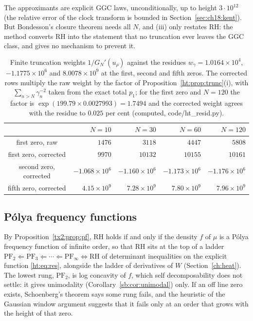 The approximants are explicit GGC laws, unconditionally, up to height $3\cdot10^{12}$ (the relative error of the clock transform is bounded in Section~\ref{sec:ch18:kent}). But Bondesson's closure theorem needs all $N$, and (iii) only restates RH: the method converts RH into the statement that no truncation ever leaves the GGC class, and gives no mechanism to prevent it.

\begin{table}[ht]
\centering\small
\begin{tabular}{crrrr}
\toprule
 & $N=10$ & $N=30$ & $N=60$ & $N=120$\\
\midrule
first zero, raw & $1476$ & $3118$ & $4447$ & $5808$\\
first zero, corrected & $9970$ & $10132$ & $10155$ & $10161$\\
second zero, corrected & $-1.068\times10^6$ & $-1.160\times10^6$ & $-1.173\times10^6$ & $-1.176\times10^6$\\
fifth zero, corrected & $4.15\times10^9$ & $7.28\times10^9$ & $7.80\times10^9$ & $7.96\times10^9$\\
\bottomrule
\end{tabular}
\caption{Finite truncation weights $1/G_N'(u_\rho)$ against the residues $w_{\gamma}=1.0164\times10^4$, $-1.1775\times10^6$ and $8.0078\times10^9$ at the first, second and fifth zeros. The corrected rows multiply the raw weight by the factor of Proposition~\ref{ht:prop:trunc}(i), with $\sum_{n>N}\gamma_n^{-2}$ taken from the exact total $p_1$; for the first zero and $N=120$ the factor is $\exp(199.79\times0.0027993)=1.7494$ and the corrected weight agrees with the residue to $0.025$ per cent (computed, code/ht\_resid.py).}\label{ht:tab:trunc}
\end{table}

\subsection{P\'olya frequency functions}

By Proposition~\ref{tx2:prop:pf}, RH holds if and only if the density $f$ of $\mu$ is a P\'olya frequency function of infinite order, so that RH sits at the top of a ladder $\mathrm{PF}_2\Leftarrow\mathrm{PF}_3\Leftarrow\cdots\Leftarrow\mathrm{PF}_\infty\iff\mathrm{RH}$ of determinant inequalities on the explicit function \eqref{ht:eq:res}, alongside the ladder of derivatives of $W$ (Section~\ref{ch:heat}). The lowest rung, $\mathrm{PF}_2$, is log concavity of $f$, which self decomposability does not settle: it gives unimodality (Corollary~\ref{sb:cor:unimodal}) only. If an off line zero exists, Schoenberg's theorem \cite{Schoenberg51} says some rung fails, and the heuristic of the Gaussian window argument suggests that it fails only at an order that grows with the height of that zero.

